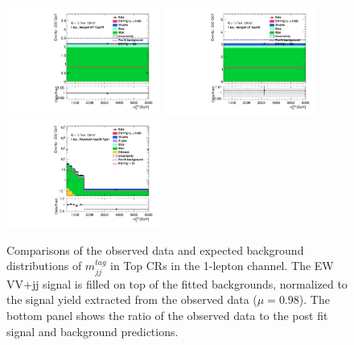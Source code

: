 \begin{figure}[]
    \centering
    \includegraphics[width=0.45\textwidth]{figures/PostFit/Region_disttagMjj_DCRTopHP_BMin0_J0_incJet1_L1_T0_incFat1_Y6051_incTag1_Fat1_GlobalFit_unconditionnal_mu1}
    \includegraphics[width=0.45\textwidth]{figures/PostFit/Region_disttagMjj_DCRTopLP_BMin0_J0_incJet1_L1_T0_incFat1_Y6051_incTag1_Fat1_GlobalFit_unconditionnal_mu1}
    \includegraphics[width=0.45\textwidth]{figures/PostFit/Region_disttagMjj_DCRTopTight_BMin0_T0_Y6051_incTag1_J2_L1_incJet1_GlobalFit_unconditionnal_mu1log} 
    \caption{Comparisons of the observed data and expected background distributions of $m^{tag}_{jj}$ in Top CRs in the 1-lepton channel.  The EW VV+jj signal is filled on top of the fitted backgrounds, normalized to the signal yield extracted from the observed data ($\mu = 0.98$). The bottom panel shows the ratio of the observed data to the post fit signal and background predictions.}
    \label{fig:postCRTop}
\end{figure}
